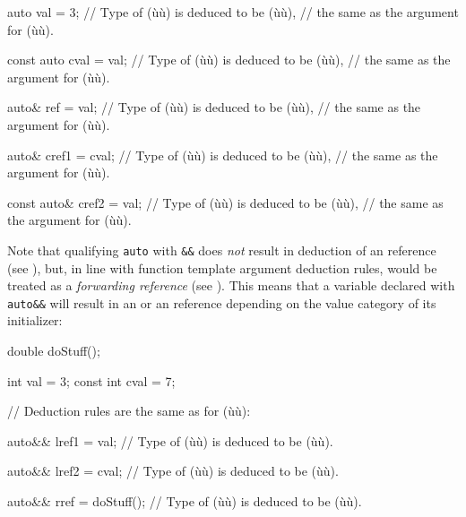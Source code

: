 \begin{emcppslisting}
auto val = 3;
    // Type of (ù{}ù) is deduced to be (ù{}ù),
    // the same as the argument for (ù{}ù).

const auto cval = val;
    // Type of (ù{}ù) is deduced to be (ù{}ù),
    // the same as the argument for (ù{}ù).

auto& ref = val;
    // Type of (ù{}ù) is deduced to be (ù{}ù),
    // the same as the argument for (ù{}ù).

auto& cref1 = cval;
    // Type of (ù{}ù) is deduced to be (ù{}ù),
    // the same as the argument for (ù{}ù).

const auto& cref2 = val;
    // Type of (ù{}ù) is deduced to be (ù{}ù),
    // the same as the argument for (ù{}ù).
\end{emcppslisting}

\noindent Note that qualifying \lstinline!auto! with \lstinline!&&!
does \emph{not} result in deduction of an  reference (see
), but, in line with function template
argument deduction rules, would be treated as a \emph{forwarding
reference} (see ). This means that a
variable declared with \lstinline!auto&&! will result in an  or an
 reference depending on the value category of its initializer:

\begin{emcppslisting}[emcppsbatch={e1,e2}]
double doStuff();

      int val  = 3;
const int cval = 7;

// Deduction rules are the same as for (ù{}ù):

auto&& lref1 = val;
    // Type of (ù{}ù) is deduced to be (ù{}ù).

auto&& lref2 = cval;
    // Type of (ù{}ù) is deduced to be (ù{}ù).

auto&& rref = doStuff();
    // Type of (ù{}ù) is deduced to be (ù{}ù).
\end{emcppslisting}

